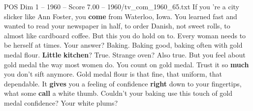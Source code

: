 \begin{textsample}{POS Dim 1 – 1960 – Score 7.00 – 1960/tv\_com\_1960\_65.txt}  \label{ex:f1_pos_027}
If you 're a city slicker like Ann Foster, you \textbf{come} from Waterloo, Iowa.
You learned fast and wanted to read your newspaper in half, to order Danish, not sweet rolls, to almost like cardboard coffee.
But this you do hold on to.
Every woman needs to be herself at times.
Your answer?
Baking.
Baking good, baking often with gold medal flour. \textbf{Little} \textbf{kitchen}?
True.
Strange oven?
Also true.
But you feel about gold medal the way most women do.
You count on gold medal.
Trust it so \textbf{much} you don't sift anymore.
Gold medal flour is that fine, that uniform, that dependable.
It \textbf{gives} you a feeling of confidence \textbf{right} down to your fingertips, what some \textbf{call} a white thumb.
Couldn't your baking use this touch of gold medal confidence?
Your white plums?

\end{textsample}
